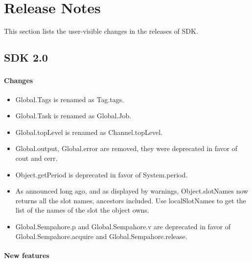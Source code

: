 \chapter{Release Notes}
\label{sec:news}

This section lists the user-visible changes in the releases of \urbi
SDK.

\section{\urbi SDK 2.0}

\subsection{\us}

\subsubsection{Changes}

\begin{itemize}
\item Global.Tags is renamed as Tag.tags.

\item Global.Task is renamed as Global.Job.

\item Global.topLevel is renamed as Channel.topLevel.

\item Global.output, Global.error are removed, they were deprecated in
  favor of cout and cerr.

\item Object.getPeriod is deprecated in favor of System.period.

\item As announced long ago, and as displayed by warnings,
  Object.slotNames now returns all the slot names, ancestors included.
  Use localSlotNames to get the list of the names of the slot the
  object owns.

\item Global.Sempahore.p and Global.Sempahore.v are deprecated in favor of
  Global.Sempahore.acquire and Global.Sempahore.release.
\end{itemize}

\subsubsection{New features}

